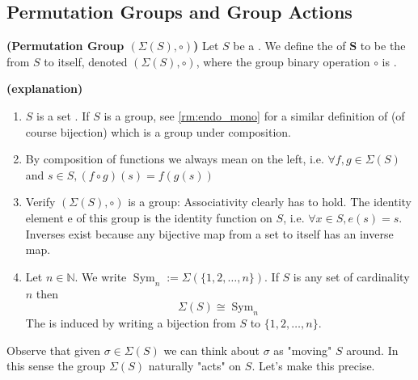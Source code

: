\documentclass{article}
\newcommand{\bfs}[1]{\textbf{({#1}) }}
\newcommand{\Sym}{\operatorname{Sym}}
\begin{document}
\subsection{Permutation Groups and Group Actions}
\begin{defa}{\bfs{Permutation Group $(\Sigma(S),\circ)$}}
   Let $S$ be a . We define the  of $\boldsymbol{S}$ to be the  from $S$ to itself, denoted $(\Sigma(S),\circ)$, where the group binary operation $\circ$ is .  
\end{defa} 
\begin{rema}{\bfs{explanation}}
\begin{enumerate}
    \item $S$ is a set . If $S$ is a group, see \cref{rm:endo_mono} for a similar definition of  (of course bijection) which is a group under composition.
    \item By composition of functions we always mean on the left, i.e. $\forall f, g \in \Sigma(S)$ and $s \in S, (f \circ g)(s)=f(g(s))$
    \item Verify $(\Sigma(S),\circ)$ is a group: Associativity clearly has to hold. The identity element e of this group is the identity function on $S$, i.e. $\forall x \in S, e(s)=s .$ Inverses exist because any bijective map from a set to itself has an inverse map.
    \item Let $n \in \mathbb{N} .$ We write  $\Sym_{n}:=\Sigma(\{1,2, \ldots, n\}) .$ If $S$ is any set of cardinality $n$ then
    {$$\Sigma(S)\cong \Sym_{n}$$}
    The  is induced by writing a bijection from $S$ to $\{1,2, \ldots, n\} .$
\end{enumerate}
\end{rema}

 Observe that given $\sigma \in \Sigma(S)$ we can think about $\sigma$ as "moving" $S$ around. In this sense the group $\Sigma(S)$ naturally "acts" on $S .$ Let's make this precise.
\end{document}
